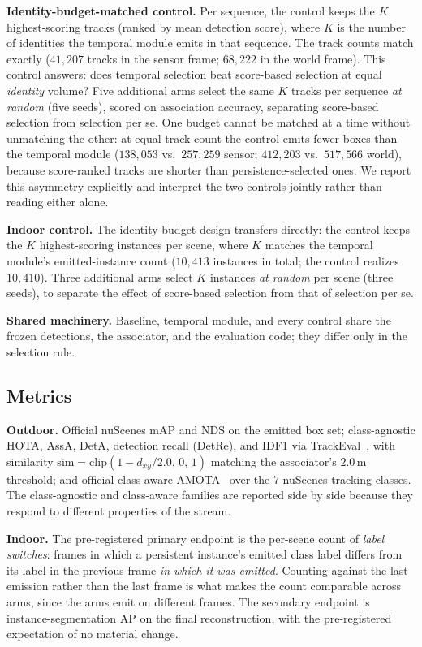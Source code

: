 \noindent\textbf{Identity-budget-matched control.} Per sequence, the control
keeps the $K$ highest-scoring tracks (ranked by mean detection score), where
$K$ is the number of identities the temporal module emits in that sequence.
The track counts match exactly ($41{,}207$ tracks in the sensor frame;
$68{,}222$ in the world frame). This control answers: does temporal
selection beat score-based selection at equal \emph{identity} volume? Five
additional arms select the same $K$ tracks per sequence \emph{at random}
(five seeds), scored on association accuracy, separating score-based
selection from selection per se. One budget cannot
be matched at a time without unmatching the other: at equal track count the
control emits fewer boxes than the temporal module ($138{,}053$ vs.\
$257{,}259$ sensor; $412{,}203$ vs.\ $517{,}566$ world), because score-ranked
tracks are shorter than persistence-selected ones. We report this asymmetry
explicitly and interpret the two controls jointly rather than reading either
alone.

\noindent\textbf{Indoor control.} The identity-budget design transfers
directly: the control keeps the $K$ highest-scoring instances per scene, where
$K$ matches the temporal module's emitted-instance count ($10{,}413$ instances
in total; the control realizes $10{,}410$). Three
additional arms select $K$ instances \emph{at random} per scene (three seeds),
to separate the effect of score-based selection from that of selection per se.

\noindent\textbf{Shared machinery.} Baseline, temporal module, and every
control share the frozen detections, the associator, and the evaluation code;
they differ only in the selection rule.

\subsection{Metrics}
\label{sec:metrics}
\noindent\textbf{Outdoor.} Official nuScenes mAP and NDS on the emitted box
set; class-agnostic HOTA, AssA, DetA, detection recall (DetRe), and IDF1 via
TrackEval~\cite{hota,idf1}, with similarity
$\mathrm{sim}=\mathrm{clip}(1-d_{xy}/2.0,\,0,\,1)$ matching the associator's
$2.0$\,m threshold; and official class-aware AMOTA~\cite{nuscenes_tracking}
over the $7$ nuScenes tracking classes. The class-agnostic and class-aware
families are reported side by side because they respond to different
properties of the stream.

\noindent\textbf{Indoor.} The pre-registered primary endpoint is the per-scene
count of \emph{label switches}: frames in which a persistent instance's
emitted class label differs from its label in the previous frame \emph{in
which it was emitted}. Counting against the last emission rather than the
last frame is what makes the count comparable across arms, since the arms
emit on different frames. The
secondary endpoint is instance-segmentation AP on the final reconstruction,
with the pre-registered expectation of no material change.

